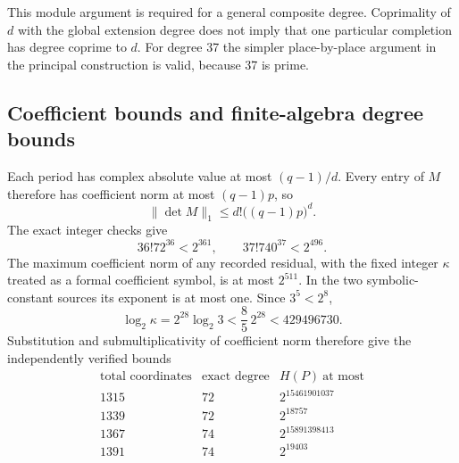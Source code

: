 This module argument is required for a general composite degree.
Coprimality of $d$ with the global extension degree does not imply
that one particular completion has degree coprime to $d$.
For degree 37 the simpler place-by-place argument in the principal
construction is valid, because 37 is prime.

\subsection{Coefficient bounds and finite-algebra degree bounds}

Each period has complex absolute value at most $(q-1)/d$.
Every entry of $M$ therefore has coefficient norm at most
$(q-1)p$, so
\[
                   \|\det M\|_1\le d!\bigl((q-1)p\bigr)^d.
\]
The exact integer checks give
\[
                     36!72^{36}<2^{361},\qquad
                     37!740^{37}<2^{496}.
\]
The maximum coefficient norm of any recorded residual, with the
fixed integer $\kappa$ treated as a formal coefficient symbol,
is at most $2^{511}$.  In the two symbolic-constant sources its
exponent is at most one.  Since $3^5<2^8$,
\[
             \log_2\kappa=2^{28}\log_2 3
                         <\frac85\,2^{28}<429496730.
\]
Substitution and submultiplicativity of coefficient norm therefore
give the independently verified bounds
\[
\begin{array}{c|c|c}
 \text{total coordinates}&\text{exact degree}&H(P)\ \text{at most}\\\hline
 1315&72&2^{15461901037}\\
 1339&72&2^{18757}\\
 1367&74&2^{15891398413}\\
 1391&74&2^{19403}
\end{array}
\]

